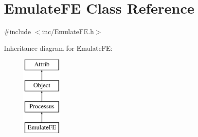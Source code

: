 \hypertarget{classEmulateFE}{}\section{Emulate\+FE Class Reference}
\label{classEmulateFE}


{\ttfamily \#include $<$inc/\+Emulate\+F\+E.\+h$>$}

Inheritance diagram for Emulate\+FE\+:\begin{figure}[H]
\begin{center}
\leavevmode
\includegraphics[height=4.000000cm]{classEmulateFE}
\end{center}
\end{figure}
